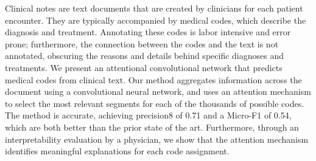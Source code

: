 Clinical notes are text documents that are created by clinicians for each patient encounter. They are typically accompanied by medical codes, which describe the diagnosis and treatment. Annotating these codes is labor intensive and error prone; furthermore, the connection between the codes and the text is not annotated, obscuring the reasons and details behind specific diagnoses and treatments. We present an attentional convolutional network that predicts medical codes from clinical text. Our method aggregates information across the document using a convolutional neural network, and uses an attention mechanism to select the most relevant segments for each of the thousands of possible codes. The method is accurate, achieving precision\@8 of 0.71 and a Micro-F1 of 0.54, which are both better than the prior state of the art. Furthermore, through an interpretability evaluation by a physician, we show that the attention mechanism identifies meaningful explanations for each code assignment.
